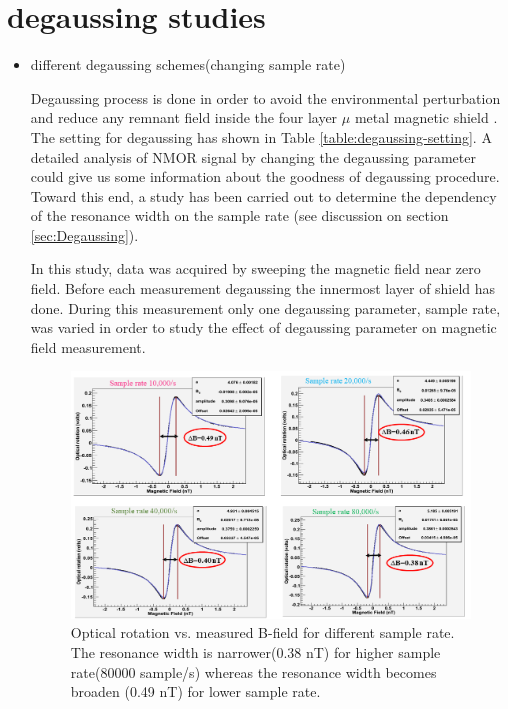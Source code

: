    \section{degaussing studies\label{sec:degaussing}}  
   \begin{itemize}
   \item different degaussing schemes(changing sample rate)
   
  
Degaussing process is done in order to avoid the environmental perturbation and reduce any remnant field inside the four layer $\mu$ metal magnetic shield \cite{doi:10.1063/1.2713433}. The setting for degaussing has shown in Table \ref{table:degaussing-setting}.  A detailed analysis of NMOR signal by changing the degaussing parameter could give us some information about the goodness of degaussing procedure. Toward this end, a study has been carried out to determine  the dependency of the resonance width on the sample rate (see discussion on section \ref{sec:Degaussing}). 

In this study, data was acquired by sweeping the magnetic field near zero field. Before each measurement degaussing the innermost layer of shield has done. During this measurement only one degaussing parameter, sample rate, was varied in order to study the effect of degaussing parameter on magnetic field measurement.  

   \begin{figure}[h]
\centering\includegraphics[width=0.7\linewidth]{figures/sample_rate}
\caption{ Optical rotation vs. measured B-field   for different sample rate. The resonance width is narrower(0.38 nT) for higher sample rate(80000 sample/s) whereas the resonance width becomes broaden (0.49 nT) for lower sample rate.\label{fig:different sample rate} }
\end{figure}


\end{itemize}
